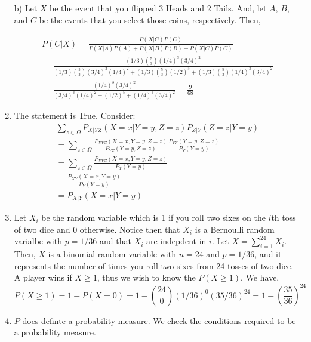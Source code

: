 \documentclass[12pt]{article}
\theoremstyle{plain}
\theoremstyle{definition}
\begin{document}
\begin{enumerate}
\vspace{1pc}
b) Let $X$ be the event that you flipped 3 Heads and 2 Tails. And, let $A$, $B$, and $C$ be the events that you select those coins, respectively. Then, 


\begin{align*}
P(C|X) = \frac{P(X|C)P(C)}{P(X|A)P(A) + P(X|B)P(B) + P(X|C)P(C)} \\
= \frac{ (1/3) \binom{5}{3} (1/4)^3(3/4)^2}{ (1/3) \binom{5}{3}(3/4)^3(1/4)^2 + (1/3)\binom{5}{3}(1/2)^5 + (1/3) \binom{5}{3}(1/4)^3(3/4)^2 } \\
= \frac{(1/4)^3 (3/4)^2}{ (3/4)^3(1/4)^2 + (1/2)^5 + (1/4)^3(3/4)^2} = \frac{9}{68} 
\end{align*}

\vspace{1pc}


\item
The statement is True. Consider:
\begin{align*}
\sum_{z \in \Omega} P_{X|YZ}(X=x | Y=y, Z=z) P_{Z|Y}(Z=z | Y=y) \\ 
= \sum_{z \in \Omega} \frac{P_{XYZ}(X=x, Y=y, Z=z)}{P_{YZ}(Y=y, Z=z)} \frac{P_{YZ}(Y=y, Z=z)}{P_Y(Y=y)} \\
= \sum_{z \in \Omega} \frac{P_{XYZ}(X=x, Y=y, Z=z)}{P_Y(Y=y)} \\
= \frac{P_{XY}(X=x, Y=y)}{P_Y(Y=y)} \\ 
= P_{X|Y}(X=x | Y=y)
\end{align*}

\vspace{1pc}

\item
Let $X_i$ be the random variable which is 1 if you roll two sixes on the $i$th toss of two dice and $0$ otherwise. Notice then that $X_i$ is a Bernoulli random varialbe with $p = 1/36$ and that $X_i$ are indepdent in $i$. Let $X = \sum_{i=1}^{24} X_i$. Then, $X$ is a binomial random variable with $n=24$ and $p = 1/36$, and it represents the number of times you roll two sixes from 24 tosses of two dice. A player wins if $X \geq 1$, thus we wish to know the $P(X \geq 1)$. We have,
$$ P(X \geq 1) = 1 - P(X = 0) = 1 - \binom{24}{0}(1/36)^{0}(35/36)^{24} = 1 - (\frac{35}{36})^{24} $$


\vspace{1pc}

\item
$P$ does definte a probability measure. We check the conditions required to be a probability measure.


\end{enumerate}
\end{document}
